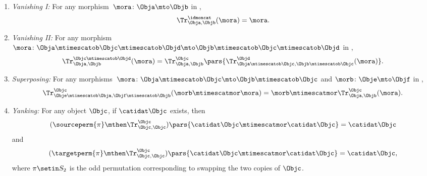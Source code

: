 {\begin{widepar}
\begin{ctdefinition}
\begin{enumerate}
                \item \emph{Vanishing I:}
                      For any morphism~$\mora \colon \Obja\mto \Objb$ in \CatC,
                      \begin{equation}
                          \label{eq:semicat-trace-vanishing_1-b}
                          \Tr_{\Obja,\Objb}^\idmoncat (\mora)=\mora.
                      \end{equation}

                \item \emph{Vanishing II:}
                      For any morphism~$\mora \colon \Obja\mtimescatob \Objc \mtimescatob \Objd \mto \Objb\mtimescatob \Objc \mtimescatob \Objd$ in \CatC,
                      \begin{equation}
                          \label{eq:semicat-trace-vanishing_2-b}
                          \Tr_{\Obja,\Objb}^{\Objc\mtimescatob \Objd}(\mora)=\Tr_{\Obja,\Objb}^\Objc\pars{
                              \Tr_{\Obja \mtimescatob \Objc, \Objb \mtimescatob \Objc}^\Objd(\mora)}.
                      \end{equation}

                \item \emph{Superposing:}
                      For any morphisms~$\mora\colon \Obja\mtimescatob \Objc \mto \Objb\mtimescatob \Objc$ and $\morb \colon \Obje \mto \Objf$ in \CatC,
                      \begin{equation}
                          \label{eq:semicat-trace-superposing-b}
                          \Tr_{\Obje\mtimescatob \Obja,\Objf\mtimescatob \Objb}^{\Objc}(\morb \mtimescatmor \mora)=\morb \mtimescatmor \Tr_{\Obja,\Objb}^\Objc(\mora).
                      \end{equation}

                \item \emph{Yanking:}
                      For any object $\Objc$, if $\catidat\Objc$ exists, then
                      \begin{equation}
                          \label{eq:semicat-trace-yanking-I-b}
                          (\sourceperm{\pi} \mthen \Tr_{\Objc,\Objc}^\Objc)\pars{\catidat\Objc \mtimescatmor \catidat\Objc }=\catidat\Objc
                      \end{equation}
                      and
                      \begin{equation}
                          \label{eq:semicat-trace-yanking-II-b}
                          (\targetperm{\pi} \mthen \Tr_{\Objc,\Objc}^\Objc)\pars{\catidat\Objc \mtimescatmor \catidat\Objc }=\catidat\Objc,
                      \end{equation}
                      where $\pi \setin S_2$ is the odd permutation corresponding to swapping the two copies of $\Objc$.
            \end{enumerate}
        \end{ctdefinition}
    \end{widepar}

}
